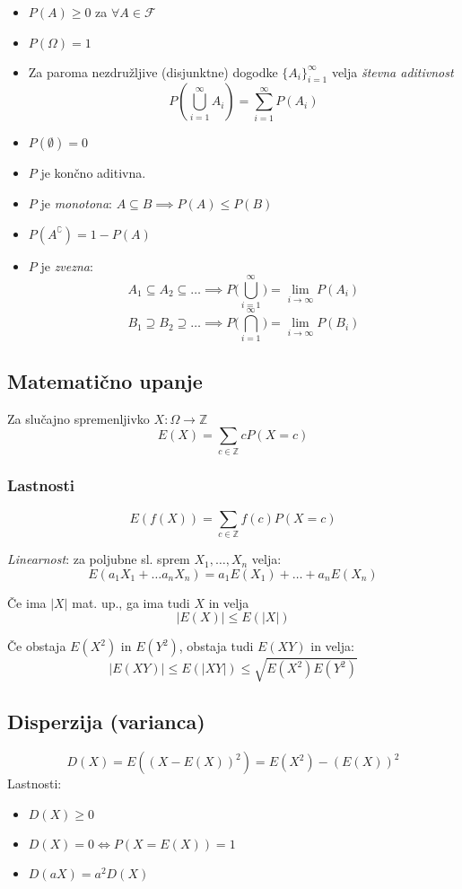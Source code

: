 \begin{multicols}{4}
\begin{itemize}
    \item $P(A) \geq 0$ za $\forall A \in \mathcal{F}$
    \item $P(\Omega) = 1$
    \item Za paroma nezdružljive (disjunktne) dogodke $\{ A_i \}_{i=1}^\infty $ velja \textit{števna aditivnost}
    \[ P(\bigcup_{i=1}^\infty A_i) = \sum_{i=1}^\infty P(A_i)\]
    \item $P(\emptyset) = 0$
    \item $P$ je končno aditivna.
    \item $P$ je \textit{monotona}: $A \subseteq B \implies P(A) \leq P(B)$
    \item $P(A^\complement) = 1 - P(A)$
    \item $P$ je \textit{zvezna}:
    \[ A_1 \subseteq A_2 \subseteq \dots \implies P\big(\bigcup_{i=1}^\infty\big) = \lim_{i \to \infty} P(A_i)\]
    \[ B_1 \supseteq B_2 \supseteq \dots \implies P\big(\bigcap_{i=1}^\infty\big) = \lim_{i \to \infty} P(B_i)\]
\end{itemize}

\subsection{Matematično upanje}
Za slučajno spremenljivko $X: \Omega  \to \mathbb{Z}$
\[ E(X) =  \sum_{c\in \mathbb{Z}} c P(X = c)\]

\subsubsection{Lastnosti}
\[ E(f(X)) = \sum_{c \in \mathbb{Z}} f(c) P(X = c) \]

\textit{Linearnost}: za poljubne sl. sprem $X_1, \dots, X_n$ velja:
\[ E(a_1 X_1 + \dots a_n X_n) = a_1 E(X_1) + \dots + a_n E(X_n) \]

Če ima $|X|$ mat. up., ga ima tudi $X$ in velja 
\[|E(X)| \leq E(|X|) \]

Če obstaja $E(X^2)$ in $E(Y^2)$, obstaja tudi $E(XY)$ in velja:
\[|E(XY)| \leq E(|XY|) \leq \sqrt{E(X^2)E(Y^2)} \]

\subsection{Disperzija (varianca)}
\[D(X) = E((X - E(X))^2) = E(X^2) - (E(X))^2\]
Lastnosti: 
\begin{itemize}
    \item $D(X) \geq 0$
    \item $D(X) = 0 \iff P(X = E(X)) = 1$
    \item $D(aX) = a^2 D(X)$
\end{itemize}


\end{multicols}
